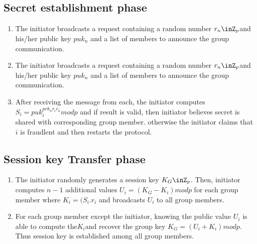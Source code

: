 \documentclass[10pt,a4paper,journal]{IEEEtran}
\begin{document}
\subsection{Secret establishment phase}
\begin{enumerate}
\item The initiator broadcasts a request containing a random number \textit{$r_{n}\inZ_{p}$}and his/her public key \textit{$puk_{n}$}  and a list of members to announce the group communication.
\item The initiator broadcasts a request containing a random number \textit{$r_{n}\inZ_{p}$}and his/her public key \textit{$puk_{n}$}  and a list of members to announce the group communication.
\item After receiving the message from each, the initiator computes \textit{$S_{i}=puk_{i}^{prk_{n}r_{i}r_{n}}mod p$} and if result is valid, then initiator believes secret is shared with corresponding group member. otherwise the initiator claims that \textit{$i$} is fraudlent and then restarts the protocol.
\end{enumerate}
\subsection{Session key Transfer phase}
\begin{enumerate}
\item The initiator randomly generates a session key \textit{$K_{G}\inZ_{p}$}. Then, initiator computes \textit{$n-1$} additional values \textit{$U_{i}=(K_{G}-K_{i})mod p$} for each group member where \textit{$K_{i}=(S_{i}.r_{i}$} and broadcasts \textit{$U_{i}$} to all group members.
\item For each group member except the initiator, knowing the public value \textit{$U_{i}$} is able to compute the\textit{$K_{i}$}and recover the group key \textit{$K_{G}=(U_{i}+K_{i})mod p$}. Thus session key is established among all group members.
\end{enumerate}

\end{document}
